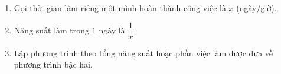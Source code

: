 \begin{enumerate}
\item Gọi thời gian làm riêng một mình hoàn thành công việc là $x$ (ngày/giờ).
\item Năng suất làm trong $1$ ngày là $\dfrac{1}{x}$.
\item Lập phương trình theo tổng năng suất hoặc phần việc làm được đưa về phương trình bậc hai.
\end{enumerate}
